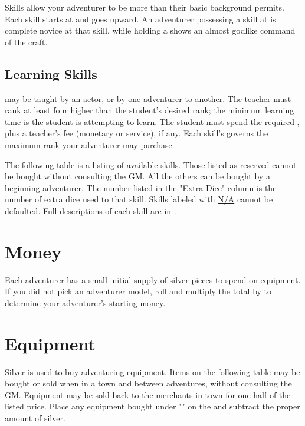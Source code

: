 \begin{multicols*}{2}
Skills allow your adventurer to be more than their basic background permits. Each skill starts at  and goes upward. An adventurer possessing a skill at  is complete novice at that skill, while holding a  shows an almost godlike command of the craft.

\subsection{Learning Skills}
 may be taught by an actor, or by one adventurer to another. The teacher must rank at least four higher than the student's desired rank; the minimum learning time is  the student is attempting to learn. The student must spend the required \EP, plus a teacher's fee (monetary or service), if any. Each skill's  governs the maximum rank your adventurer may purchase.\\

The following table is a listing of available skills. Those listed as \ul{reserved} cannot be bought without consulting the GM. All the others can be bought by a beginning adventurer. The number listed in the "Extra Dice" column is the number of extra dice used to  that skill. Skills labeled with \ul{N/A} cannot be defaulted. Full descriptions of each skill are in .
\vfill\null
\label{create-skills}
\begin{tcbraster}[raster columns=1,boxrule=0pt,title=\textbf{Skills},left=0pt,right=0pt,top=0pt,bottom=0pt,boxsep=0pt,boxrule=0.6pt,lefttitle=2.5mm,toptitle=1mm,bottomtitle=1mm,colbacktitle=Navy,colback=white]
\end{tcbraster}
\section{Money}
Each adventurer has a small initial supply of silver pieces to spend on equipment. If you did not pick an adventurer model, roll  and multiply the total by  to determine your adventurer's starting money.
\section{Equipment}
Silver is used to buy adventuring equipment. Items on the following table may be bought or sold when in a town and between adventures, without consulting the GM. Equipment may be sold back to the merchants in town for one half of the listed price. Place any equipment bought under "" on the  and subtract the proper amount of silver.


\end{multicols*}
